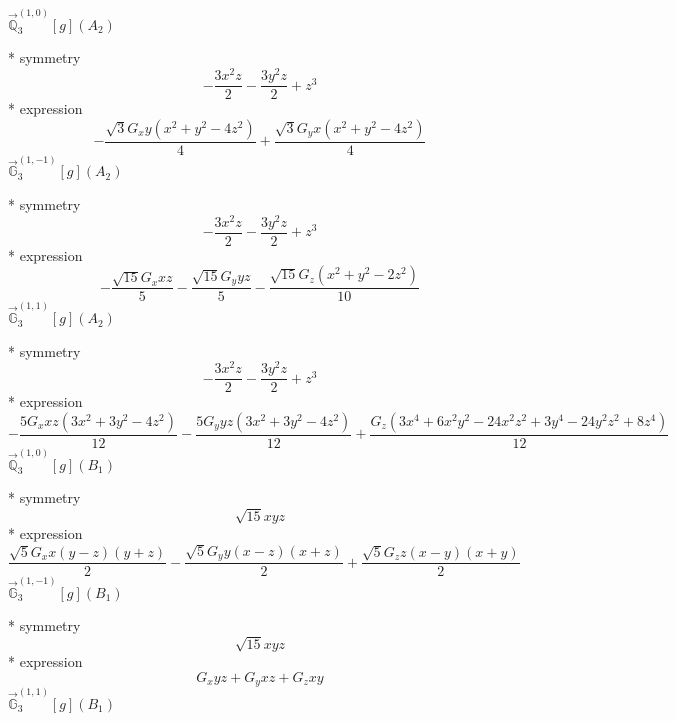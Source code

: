 \documentclass[fleqn,8pt]{jsarticle}
\begin{document}
\noindent\quad $\vec{\mathbb{Q}}_{3}^{(1,0)}[g](A_{2})$

\noindent\quad ** symmetry
\begin{dmath*}
- \frac{3 x^{2} z}{2} - \frac{3 y^{2} z}{2} + z^{3}
\end{dmath*}
\noindent\quad ** expression
\begin{dmath*}
- \frac{\sqrt{3} G_{x} y \left(x^{2} + y^{2} - 4 z^{2}\right)}{4} + \frac{\sqrt{3} G_{y} x \left(x^{2} + y^{2} - 4 z^{2}\right)}{4}
\end{dmath*}
\noindent\quad $\vec{\mathbb{G}}_{3}^{(1,-1)}[g](A_{2})$

\noindent\quad ** symmetry
\begin{dmath*}
- \frac{3 x^{2} z}{2} - \frac{3 y^{2} z}{2} + z^{3}
\end{dmath*}
\noindent\quad ** expression
\begin{dmath*}
- \frac{\sqrt{15} G_{x} x z}{5} - \frac{\sqrt{15} G_{y} y z}{5} - \frac{\sqrt{15} G_{z} \left(x^{2} + y^{2} - 2 z^{2}\right)}{10}
\end{dmath*}
\noindent\quad $\vec{\mathbb{G}}_{3}^{(1,1)}[g](A_{2})$

\noindent\quad ** symmetry
\begin{dmath*}
- \frac{3 x^{2} z}{2} - \frac{3 y^{2} z}{2} + z^{3}
\end{dmath*}
\noindent\quad ** expression
\begin{dmath*}
- \frac{5 G_{x} x z \left(3 x^{2} + 3 y^{2} - 4 z^{2}\right)}{12} - \frac{5 G_{y} y z \left(3 x^{2} + 3 y^{2} - 4 z^{2}\right)}{12} + \frac{G_{z} \left(3 x^{4} + 6 x^{2} y^{2} - 24 x^{2} z^{2} + 3 y^{4} - 24 y^{2} z^{2} + 8 z^{4}\right)}{12}
\end{dmath*}
\noindent\quad $\vec{\mathbb{Q}}_{3}^{(1,0)}[g](B_{1})$

\noindent\quad ** symmetry
\begin{dmath*}
\sqrt{15} x y z
\end{dmath*}
\noindent\quad ** expression
\begin{dmath*}
\frac{\sqrt{5} G_{x} x \left(y - z\right) \left(y + z\right)}{2} - \frac{\sqrt{5} G_{y} y \left(x - z\right) \left(x + z\right)}{2} + \frac{\sqrt{5} G_{z} z \left(x - y\right) \left(x + y\right)}{2}
\end{dmath*}
\noindent\quad $\vec{\mathbb{G}}_{3}^{(1,-1)}[g](B_{1})$

\noindent\quad ** symmetry
\begin{dmath*}
\sqrt{15} x y z
\end{dmath*}
\noindent\quad ** expression
\begin{dmath*}
G_{x} y z + G_{y} x z + G_{z} x y
\end{dmath*}
\noindent\quad $\vec{\mathbb{G}}_{3}^{(1,1)}[g](B_{1})$
\end{document}

